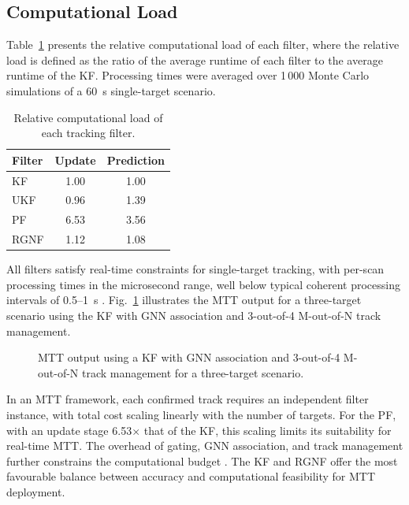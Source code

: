 \documentclass[conference]{IEEEtran}
\begin{document}
\subsection{Computational Load}

Table~\ref{tab:comp_load} presents the relative computational load of each filter, where the relative load is defined as the ratio of the average runtime of each filter to the average runtime of the KF. Processing times were averaged over 1\,000 Monte Carlo simulations of a 60~s single-target scenario.

\begin{table}[H]
  \centering
  \caption{Relative computational load of each tracking filter.}
  \label{tab:comp_load}
  \begin{tabular}{@{}lcc@{}}
  \toprule
  \textbf{Filter} & \textbf{Update} & \textbf{Prediction} \\
  \midrule
  KF   & 1.00 & 1.00 \\
  UKF  & 0.96 & 1.39 \\
  PF   & 6.53 & 3.56 \\
  RGNF & 1.12 & 1.08 \\
  \bottomrule
  \end{tabular}
\end{table}

All filters satisfy real-time constraints for single-target tracking, with per-scan processing times in the microsecond range, well below typical coherent processing intervals of 0.5--1~s \cite{Howland2005a}. Fig.~\ref{fig:mtt_output} illustrates the MTT output for a three-target scenario using the KF with GNN association and 3-out-of-4 M-out-of-N track management.

\begin{figure}[H]
    \centering
    
    \caption{MTT output using a KF with GNN association and 3-out-of-4 M-out-of-N track management for a three-target scenario.}
    \label{fig:mtt_output}
\end{figure}

In an MTT framework, each confirmed track requires an independent filter instance, with total cost scaling linearly with the number of targets. For the PF, with an update stage 6.53$\times$ that of the KF, this scaling limits its suitability for real-time MTT. The overhead of gating, GNN association, and track management further constrains the computational budget \cite{Konstantinova2003}. The KF and RGNF offer the most favourable balance between accuracy and computational feasibility for MTT deployment.
\end{document}
